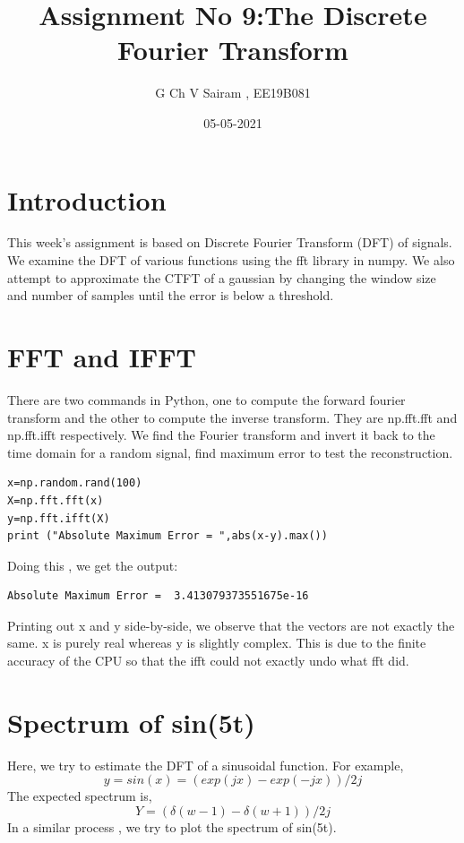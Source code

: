 \documentclass[11pt, a4paper]{article}
\title{Assignment No 9:The Discrete Fourier Transform}
\author{G Ch V Sairam , EE19B081}
\date{05-05-2021}
\begin{document}
		
		
\maketitle
\section*{Introduction}
This week’s assignment is based on Discrete Fourier Transform (DFT) of signals. We examine the DFT of various functions using the fft library in numpy. We also attempt to approximate the CTFT of a gaussian by changing the window size and number of samples until the error is below a threshold.

\section*{FFT and IFFT}
There are two commands in Python, one to compute the forward fourier transform and the other to compute the inverse transform.
They are np.fft.fft and np.fft.ifft respectively.
\newline
We find the Fourier transform and invert it back to the time domain for a random signal, find maximum error to test the reconstruction.
\begin{verbatim}
x=np.random.rand(100)
X=np.fft.fft(x)
y=np.fft.ifft(X)
print ("Absolute Maximum Error = ",abs(x-y).max())
\end{verbatim}
Doing this , we get the output:
\begin{verbatim}	
Absolute Maximum Error =  3.413079373551675e-16
\end{verbatim}

Printing out x and y side-by-side, we observe that the vectors are not exactly the same. x is purely real whereas y is slightly complex. This is due to the finite accuracy of the CPU so that the ifft could not exactly undo what fft did.

\section*{Spectrum of sin(5t)}
Here, we try to estimate the DFT of a sinusoidal function. For example,
\begin{equation*}
y=sin(x) = (exp(jx) - exp(-jx))/2j
\end{equation*}
The expected spectrum is,
\begin{equation*}
Y=(\delta(w-1) - \delta(w+1))/2j
\end{equation*}
In a similar process , we try to plot the spectrum of sin(5t).
\end{document}
